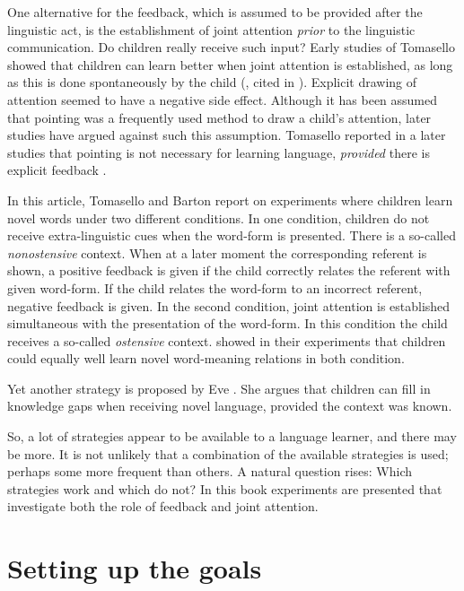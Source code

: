 
One alternative for the feedback, which is assumed to be provided after the linguistic act, is the establishment of joint attention {\em prior} to the linguistic communication. Do children really receive such input? Early studies of Tomasello showed that children can learn better when joint attention is established, as long as this is done spontaneously by the child (\citealt{tomaselloetal:1986}, cited in \citealt{barrett:1995}). Explicit drawing of attention seemed to have a negative side effect. Although it has been assumed that pointing was a frequently used method to draw a child's attention, later studies have argued against such this assumption. Tomasello reported in a later studies that pointing is not necessary for learning language, {\em provided} there is explicit feedback \citep{tomasellobarton:1994}. 

In this article, Tomasello and Barton report on experiments where children learn novel words under two different conditions. In one condition, children do not receive extra-linguistic cues when the word-form is presented. There is a so-called {\em nonostensive} context. When at a later moment the corresponding referent is shown, a positive feedback is given if the child correctly relates the referent with given word-form. If the child relates the word-form to an incorrect referent, negative feedback is given. In the second condition, joint attention is established simultaneous with the presentation of the word-form. In this condition the child receives a so-called {\em ostensive} context. \citet{tomasellobarton:1994} showed in their experiments that children could equally well learn novel word-meaning relations in both condition.

Yet another strategy is proposed by Eve \citet{clark:1993}. She argues that children can fill in knowledge gaps when receiving novel language, provided the context was known. 


So, a lot of strategies appear to be available to a language learner, and there may be more. It is not unlikely that a combination of the available strategies is used; perhaps some more frequent than others. A natural question rises: Which strategies work and which do not? In this book experiments are presented that investigate both the role of feedback and joint attention.


\section{Setting up the goals}\label{s:intro:goals}

